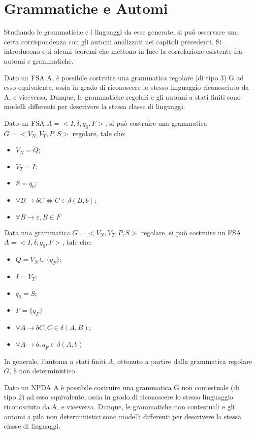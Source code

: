  \break

  \section{Grammatiche e Automi}
  Studiando le grammatiche e i linguaggi da esse generate, si può osservare una certa corrispondenza con gli automi analizzati nei capitoli precedenti. Si introducono qui alcuni teoremi che mettono in luce la correlazione esistente fra automi e grammatiche.

  \begin{theorem}
    Dato un FSA A, è possibile costruire una grammatica regolare (di tipo 3) G ad esso equivalente, ossia in grado di riconoscere lo stesso linguaggio riconosciuto da A, e viceversa. Dunque, le grammatiche regolari e gli automi a stati finiti sono modelli differenti per descrivere la stessa classe di linguaggi. 
  \end{theorem}
  Dato un FSA \(A=<I, \delta, q_0, F>\), si può costruire una grammatica \(G=<V_N,V_T, P, S>\) regolare, tale che:
  \begin{itemize}
    \item \(V_N=Q\);
    \item \(V_T=I\);
    \item \(S=q_0\);
    \item \(\forall B\to bC\Leftrightarrow C\in\delta(B,b)\);
    \item \(\forall B\to\varepsilon, B\in F\)
  \end{itemize}
  Data una grammatica \(G=<V_N, V_T, P, S>\) regolare, si può costruire un FSA \(A=<I, \delta, q_0, F>\), tale che:
  \begin{itemize}
    \item \(Q=V_N\cup\{q_F\}\);
    \item \(I=V_T\);
    \item \(q_0=S\);
    \item \(F=\{q_F\}\)
    \item \(\forall A\to bC, C\in \delta(A,B)\);
    \item \(\forall A\to b, q_F\in\delta(A,b)\)
  \end{itemize}

  In generale, l'automa a stati finiti \(A\), ottenuto a partire dalla grammatica regolare \(G\), è non deterministico.

  \begin{theorem}
    Dato un NPDA A è possibile costruire una grammatica G non contestuale (di tipo 2) ad esso equivalente, ossia in grado di riconoscere lo stesso linguaggio riconosciuto da A, e viceversa. Dunque, le grammatiche non contestuali e gli automi a pila non deterministici sono modelli differenti per descrivere la stessa classe di linguaggi.
  \end{theorem}

